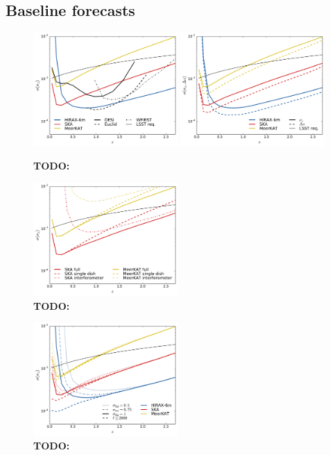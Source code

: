 \documentclass[prd,twocolumn]{revtex4}
\newcommand{\TODO}[1]{{\bf TODO:} \textcolor{red}{#1}}
\begin{document}
  \subsection{Baseline forecasts} \label{ssec:results.baseline}
    \begin{figure}
      \centering
      \includegraphics[width=0.49\textwidth]{compare_spec}
      \includegraphics[width=0.49\textwidth]{compare_wbias}
      \caption{\TODO{}}
      \label{fig:compare_spec}
    \end{figure}
    \begin{figure}
      \centering
      \includegraphics[width=0.49\textwidth]{compare_if_sd}
      \caption{\TODO{}}
      \label{fig:compare_if_sd}
    \end{figure}
    \begin{figure}
      \centering
      \includegraphics[width=0.49\textwidth]{compare_nlin}
      \caption{\TODO{}}
      \label{fig:compare_nlin}
    \end{figure}
\end{document}
